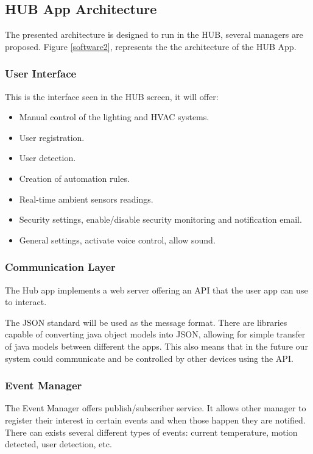 \subsection{HUB App Architecture}

The presented architecture is designed to run in the HUB, several managers are proposed. Figure \ref{software2}, represents the the architecture of the HUB App.

\subsubsection{User Interface}
This is the interface seen in the HUB screen, it will offer:

\begin{itemize}
  \item Manual control of the lighting and HVAC systems.
  \item User registration.
  \item User detection.
  \item Creation of automation rules.
  \item Real-time ambient sensors readings.
  \item Security settings, enable/disable security monitoring and notification email.
  \item General settings, activate voice control, allow sound.
   
\end{itemize}

\subsubsection{Communication Layer}

The Hub app implements a web server offering an \ac{API} that the user app can use to interact. 

The \ac{JSON} standard will be used as the message format. There are libraries capable of converting java object models into JSON, allowing for simple transfer of java models between different the apps. This also means that in the future our system could communicate and be controlled by other devices using the \ac{API}.

\subsubsection{Event Manager}
The Event Manager offers publish/subscriber service. It allows other manager to register their interest in certain events and when those happen they are notified. There can exists several different types of events: current temperature, motion detected, user detection, etc.

